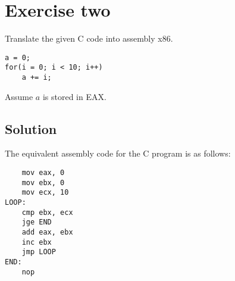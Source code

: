 \section{Exercise two}
Translate the given C code into assembly x86. 
\begin{verbatim}
a = 0;
for(i = 0; i < 10; i++)
    a += i;
\end{verbatim}
Assume $a$ is stored in EAX.

\subsection{Solution}
The equivalent assembly code for the C program is as follows:
\begin{verbatim}
    mov eax, 0
    mov ebx, 0
    mov ecx, 10
LOOP:
    cmp ebx, ecx
    jge END
    add eax, ebx
    inc ebx
    jmp LOOP
END:
    nop
\end{verbatim}